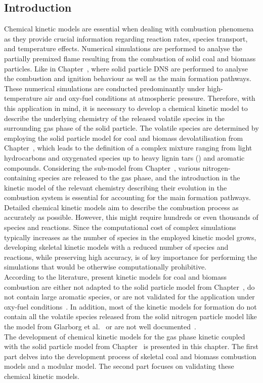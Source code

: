 \begin{refsection}
\newpage
\section{Introduction} 
Chemical kinetic models are essential when dealing with combustion phenomena as they provide crucial information regarding reaction rates, species transport, and temperature effects. Numerical simulations are performed to analyse the partially premixed flame resulting from the combustion of solid coal and biomass particles. Like in Chapter~, where solid particle DNS are performed to analyse the combustion and ignition behaviour as well as the main  formation pathways. These numerical simulations are conducted predominantly under high-temperature air and oxy-fuel conditions at atmospheric pressure. Therefore, with this application in mind, it is necessary to develop a chemical kinetic model to describe the underlying chemistry of the released volatile species in the surrounding gas phase of the solid particle. The volatile species are determined by employing the solid particle model for coal and biomass devolatilisation from Chapter~, which leads to the definition of a complex mixture ranging from light hydrocarbons and oxygenated species up to heavy lignin tars () and aromatic compounds. Considering the  sub-model from Chapter~, various nitrogen-containing species are released to the gas phase, and the introduction in the kinetic model of the relevant chemistry describing their evolution in the combustion system is essential for accounting for the main  formation pathways.
\\
Detailed chemical kinetic models aim to describe the combustion process as accurately as possible. However, this might require hundreds or even thousands of species and reactions. Since the computational cost of complex simulations typically increases as the number of species in the employed kinetic model grows, developing skeletal kinetic models with a reduced number of species and reactions, while preserving high accuracy, is of key importance for performing the simulations that would be otherwise computationally prohibitive.
\\
According to the literature, present kinetic models for coal and biomass combustion are either not adapted to the solid particle model from Chapter~, do not contain large aromatic species, or are not validated for the application under oxy-fuel conditions~\cite{Shamooni2021, Goyal2017, Lovas2013}. In addition, most of the kinetic models for  formation do not contain all the volatile species released from the solid nitrogen particle model like the model from Glarborg et al.~\cite{Glarborg2018} or are not well documented~\cite{Shamooni2021}. 
\\
The development of chemical kinetic models for the gas phase kinetic coupled with the solid particle model from Chapter~ is presented in this chapter. The first part delves into the development process of skeletal coal and biomass combustion models and a modular  model. The second part focuses on validating these chemical kinetic models.




\end{refsection}
